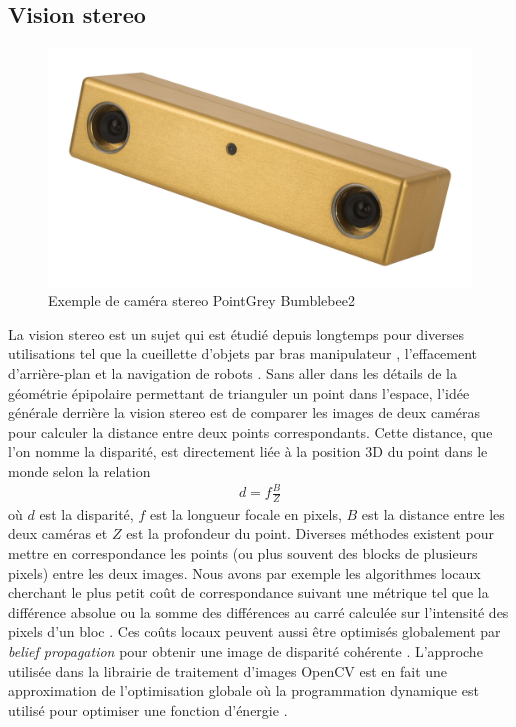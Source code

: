 \subsection{Vision stereo}

\begin{figure}[h]
  \centering
  \includegraphics[width=0.5\linewidth]{images/bumblebee2.jpg}
  \caption[Exemple de caméra stereo]{Exemple de caméra stereo PointGrey Bumblebee2}
  \label{fig:stereo_camera}
\end{figure}

La vision stereo est un sujet qui est étudié depuis longtemps pour diverses utilisations tel que la cueillette d'objets par bras manipulateur \citep{Hernandez2017}, l'effacement d'arrière-plan \citep{Kanade1996Stereo} et la navigation de robots \citep{Fraundorfer2012}. Sans aller dans les détails de la géométrie épipolaire permettant de trianguler un point dans l'espace, l'idée générale derrière la vision stereo est de comparer les images de deux caméras pour calculer la distance entre deux points correspondants. Cette distance, que l'on nomme la disparité, est directement liée à la position 3D du point dans le monde selon la relation
\begin{align}
  d = f \frac{B}{Z}
\end{align}
où $d$ est la disparité, $f$ est la longueur focale en pixels, $B$ est la distance entre les deux caméras et $Z$ est la profondeur du point. Diverses méthodes existent pour mettre en correspondance les points (ou plus souvent des blocks de plusieurs pixels) entre les deux images. Nous avons par exemple les algorithmes locaux cherchant le plus petit coût de correspondance suivant une métrique tel que la différence absolue ou la somme des différences au carré calculée sur l'intensité des pixels d'un bloc \citep{Szeliski2011}. Ces coûts locaux peuvent aussi être optimisés globalement par \textit{belief propagation} pour obtenir une image de disparité cohérente \citep{Klaus2006}. L'approche utilisée dans la librairie de traitement d'images OpenCV est en fait une approximation de l'optimisation globale où la programmation dynamique est utilisé pour optimiser une fonction d'énergie \citep{Hirschmuller2008}.

